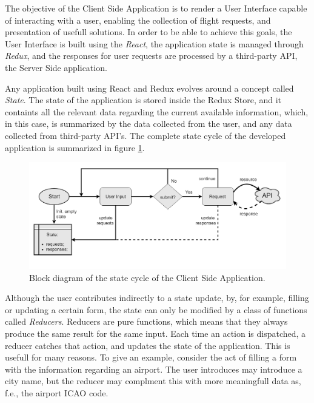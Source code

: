 

The objective of the Client Side Application is to render a User Interface capable of interacting with a user,
enabling the collection of flight requests, and presentation of usefull solutions.
In order to be able to achieve this goals, the User Interface is built using the \textit{React}, 
the application state is managed through \textit{Redux},
and the responses for user requests are processed by a third-party API, the Server Side application.

Any application built using React and Redux evolves around a concept called \textit{State}.
The state of the application is stored inside the Redux Store, 
and it containts all the relevant data regarding the current available information, which, 
in this case, is summarized by the data collected from the user, and any data collected from third-party API's.
The complete state cycle of the developed application is summarized in figure \ref{fig:app_state_cycle}.

\begin{figure}[htpb]
  \centering
  \includegraphics[width=\textwidth]{./Figures/system_implementation/state_flow.png}
  \caption{Block diagram of the state cycle of the Client Side Application.}
  \label{fig:app_state_cycle}  
\end{figure}


Although the user contributes indirectly to a state update, by, for example, filling or updating a certain form,
the state can only be modified by a class of functions called \textit{Reducers}.
Reducers are pure functions, which means that they always produce the same result for the same input.
Each time an action is dispatched, a reducer catches that action, and updates the state of the application.
This is usefull for many reasons. To give an example, consider the act of filling a form with the information 
regarding an airport. The user introduces may introduce a city name, but the reducer 
may complment this with more meaningfull data as, f.e., the airport ICAO code.  

